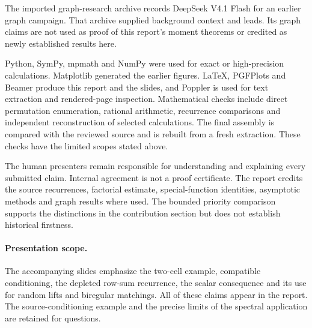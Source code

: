 \documentclass[11pt]{article}
\theoremstyle{definition}
\theoremstyle{remark}
\newcommand{\1}{\mathbf 1}
\begin{document}
The imported graph-research archive records DeepSeek V4.1 Flash for an earlier graph campaign. That archive supplied background context and leads. Its graph claims are not used as proof of this report's moment theorems or credited as newly established results here.

Python, SymPy, mpmath and NumPy were used for exact or high-precision calculations. Matplotlib generated the earlier figures. LaTeX, PGFPlots and Beamer produce this report and the slides, and Poppler is used for text extraction and rendered-page inspection. Mathematical checks include direct permutation enumeration, rational arithmetic, recurrence comparisons and independent reconstruction of selected calculations. The final assembly is compared with the reviewed source and is rebuilt from a fresh extraction. These checks have the limited scopes stated above.

The human presenters remain responsible for understanding and explaining every submitted claim. Internal agreement is not a proof certificate. The report credits the source recurrences, factorial estimate, special-function identities, asymptotic methods and graph results where used. The bounded priority comparison supports the distinctions in the contribution section but does not establish historical firstness.

\paragraph{Presentation scope.}
The accompanying slides emphasize the two-cell example, compatible conditioning, the depleted row-sum recurrence, the scalar consequence and its use for random lifts and biregular matchings. All of these claims appear in the report. The source-conditioning example and the precise limits of the spectral application are retained for questions.
\end{document}
